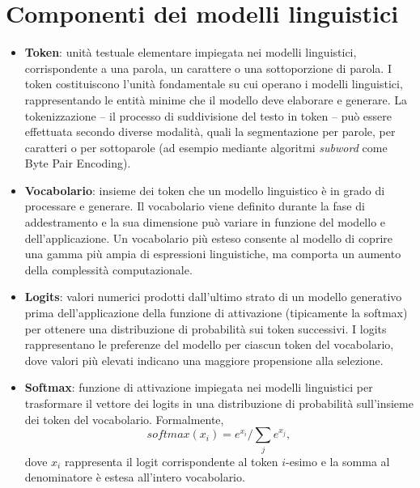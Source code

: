 \section{Componenti dei modelli linguistici}
\begin{itemize}
	\item \textbf{Token}: unità testuale elementare impiegata nei modelli linguistici, corrispondente a una parola, un carattere o una sottoporzione di parola. I token costituiscono l'unità fondamentale su cui operano i modelli linguistici, rappresentando le entità minime che il modello deve elaborare e generare. La tokenizzazione -- il processo di suddivisione del testo in token -- può essere effettuata secondo diverse modalità, quali la segmentazione per parole, per caratteri o per sottoparole (ad esempio mediante algoritmi \emph{subword} come Byte Pair Encoding).
	\item \textbf{Vocabolario}: insieme dei token che un modello linguistico è in grado di processare e generare. Il vocabolario viene definito durante la fase di addestramento e la sua dimensione può variare in funzione del modello e dell'applicazione. Un vocabolario più esteso consente al modello di coprire una gamma più ampia di espressioni linguistiche, ma comporta un aumento della complessità computazionale.
	\item \textbf{Logits}: valori numerici prodotti dall'ultimo strato di un modello generativo prima dell'applicazione della funzione di attivazione (tipicamente la softmax) per ottenere una distribuzione di probabilità sui token successivi. I logits rappresentano le preferenze del modello per ciascun token del vocabolario, dove valori più elevati indicano una maggiore propensione alla selezione.
	\item \textbf{Softmax}: funzione di attivazione impiegata nei modelli linguistici per trasformare il vettore dei logits in una distribuzione di probabilità sull'insieme dei token del vocabolario. Formalmente, 
	$$
		\mathit{softmax}(x_i) = e^{x_i} / \sum_{j} e^{x_j},
	$$
 dove $x_i$ rappresenta il logit corrispondente al token $i$-esimo e la somma al denominatore è estesa all'intero vocabolario.
\end{itemize}

